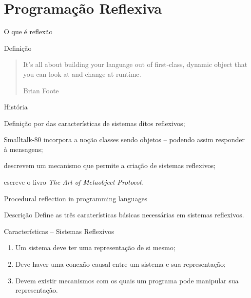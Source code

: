 \documentclass[12pt,t]{beamer}
\begin{document}
 \section{Programação Reflexiva}
	 \begin{frame}{O que é reflexão}
	 	\begin{block}{Definição}
	 		\begin{quote}
				It's all about building your language out of first-class, dynamic object that you can look at and change at runtime.
	 		\begin{flushright}
	 			Brian Foote
	 		\end{flushright} 	 		
	 		\end{quote}
	 	\end{block}
	 	\pause
	 	\begin{block}{História}
	 		\begin{description}[9999]
	 			\item[1982] Definição por  das características de sistemas ditos reflexivos;
	 			\item[1983] Smalltalk-80 incorpora a noção classes sendo objetos -- podendo assim responder à mensagens;
	 			\item[1984]  descrevem um mecanismo que permite a criação de sistemas reflexivos;
	 			\item[1991]  escreve o livro \emph{The Art of Metaobject Protocol}.
	 		\end{description}
	 	\end{block}	
	 \end{frame}
	 \begin{frame}{Procedural reflection in programming languages \cite{smith1982reflection}}
	 	\begin{block}{Descrição}
	 		Define as três caraterísticas básicas necessárias em sistemas reflexivos. 
	 	\end{block}
	 	\pause
	 	\begin{block}{Características -- Sistemas Reflexivos}
	 	  \begin{enumerate}
	 	  	\item Um sistema deve ter uma representação de si mesmo;
	 	  	\pause
	 	  	\item Deve haver uma conexão causal entre um sistema e sua representação;
	 	  	\pause
	 	  	\item Devem existir mecanismos com os quais um programa pode manipular sua representação. 
	 	  \end{enumerate}
	 	\end{block}
	 \end{frame}
\end{document}
